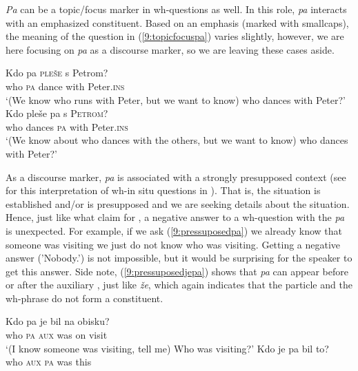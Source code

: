 \documentclass[output=paper,modfonts,newtxmath,hidelinks]{langscibook}
\begin{document}
\noindent \textit{Pa} can be a topic/focus marker in wh-questions as well. In this role, \textit{pa} interacts with an emphasized constituent. Based on an emphasis (marked with smallcaps), the meaning of the question in (\ref{9:topicfocuspa}) varies slightly, however, we are here focusing on \textit{pa} as a discourse marker, so we are leaving these cases aside.

\begin{exe}
\ex  \label{9:topicfocuspa}
\begin{xlist}
\ex \gll	Kdo pa \textsc{pleše} s Petrom?\\
		who \textsc{pa} dance with Peter.\textsc{ins}\\
\trans `(We know who runs with Peter, but we want to know) who dances with Peter?'
\ex \gll	Kdo pleše pa s \textsc{Petrom}?\\
		who dances \textsc{pa} with Peter.\textsc{ins}\\
\trans `(We know about who dances with the others, but we want to know) who dances with Peter?'
\end{xlist}
\end{exe}

\noindent As a discourse marker, \textit{pa} is associated with a strongly presupposed context (see \citealt{chengrooryck2000} for this interpretation of wh-in situ questions in ). That is, the situation is established and/or is presupposed and we are seeking details about the situation. Hence, just like what \cite{chengrooryck2000} claim for , a negative answer to a wh-question with the  \textit{pa} is unexpected. For example, if we ask (\ref{9:pressuposedpa}) we already know that someone was visiting we just do not know who was visiting. Getting a negative answer ('Nobody.') is not impossible, but it would be surprising for the speaker to get this answer. Side note, (\ref{9:pressuposedjepa}) shows that \textit{pa} can appear before or after the auxiliary , just like \textit{že}, which again indicates that the particle and the wh-phrase do not form a constituent. 

\begin{exe}
\ex \begin{xlist}
\ex \label{9:pressuposedpa}
\gll Kdo pa je bil na obisku?\\
	who \textsc{pa} \textsc{aux} was on visit\\
\trans `(I know someone was visiting, tell me) Who was visiting?'
\ex \label{9:pressuposedjepa} 
\gll Kdo je pa bil to?\\
who  \textsc{aux}  \textsc{pa} was this\\
\end{xlist}
\end{exe}
\end{document}
